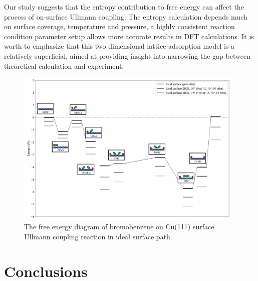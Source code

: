 \documentclass[%
 reprint,
 amsmath,amssymb,
 aps,
prb,
floatfix,
]{revtex4-2}
\newcommand{\zhzh}{\color{blue}}
\newcommand{\zhzh}{\color{blue}}
\begin{document}
{Our study suggests that the entropy contribution to free energy can affect the process of on-surface Ullmann coupling. The entropy calculation depends much on surface coverage, temperature and pressure, a highly consistent reaction condition parameter setup allows more accurate results in DFT calculations. It is worth to emphasize that this two dimensional lattice adsorption model is a relatively superficial, aimed at providing insight into narrowing the gap between theoretical calculation and experiment. 
}

\begin{figure}[hbt]
\centering
\includegraphics[width=0.98\textwidth]{Fig/entropy-correction.pdf}
\caption{The free energy diagram of bromobenzene on Cu(111) surface Ullmann coupling reaction in ideal surface path.}
\label{fig:entropy}
\end{figure}

\fi


\section{Conclusions}


\end{document}
